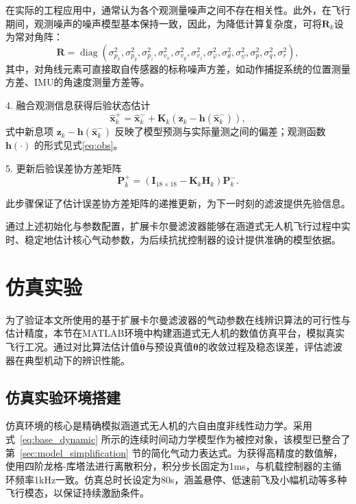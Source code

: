 在实际的工程应用中，通常认为各个观测量噪声之间不存在相关性。此外，在飞行期间，观测噪声的噪声模型基本保持一致，因此，为降低计算复杂度，可将$\boldsymbol{R}_k$设为常对角阵：
\begin{equation}
    \boldsymbol{R} = \operatorname{diag}(\sigma^2_{p_x},\sigma^2_{p_y}, \sigma^2_{p_z}, \sigma^2_{v_x},\sigma^2_{v_y}, \sigma^2_{v_z}, \sigma^2_{\varphi},\sigma^2_{\theta}, \sigma^2_{\psi}, \sigma^2_{p},\sigma^2_{q}, \sigma^2_{r}),
\end{equation}
其中，对角线元素可直接取自传感器的标称噪声方差，如动作捕捉系统的位置测量方差、IMU的角速度测量方差等。

4. 融合观测信息获得后验状态估计
\begin{equation}
    \hat{\boldsymbol{x}}_{k}^{+} = \hat{\boldsymbol{x}}_{k}^{-} + \boldsymbol{K}_k \left( \boldsymbol{z}_k - \boldsymbol{h}(\hat{\boldsymbol{x}}_{k}^{-}) \right),
\end{equation}
式中新息项 $\boldsymbol{z}_k - \boldsymbol{h}(\hat{\boldsymbol{x}}_{k}^{-})$ 反映了模型预测与实际量测之间的偏差；观测函数 $\boldsymbol{h}(\cdot)$ 的形式见式\eqref{eq:obs}。

5. 更新后验误差协方差矩阵
\begin{equation}
    \boldsymbol{P}_{k}^{+} = \left( \boldsymbol{I}_{18\times 18} - \boldsymbol{K}_k \boldsymbol{H}_k \right) \boldsymbol{P}_{k}^{-}.
\end{equation}

此步骤保证了估计误差协方差矩阵的递推更新，为下一时刻的滤波提供先验信息。

通过上述初始化与参数配置，扩展卡尔曼滤波器能够在涵道式无人机飞行过程中实时、稳定地估计核心气动参数，为后续抗扰控制器的设计提供准确的模型依据。

\section{仿真实验}%
为了验证本文所使用的基于扩展卡尔曼滤波器的气动参数在线辨识算法的可行性与估计精度，本节在MATLAB环境中构建涵道式无人机的数值仿真平台，模拟真实飞行工况。通过对比算法估计值$\hat{\boldsymbol{\theta}}$与预设真值$\boldsymbol{\theta}$的收敛过程及稳态误差，评估滤波器在典型机动下的辨识性能。

\subsection{仿真实验环境搭建}
仿真环境的核心是精确模拟涵道式无人机的六自由度非线性动力学。采用式~\eqref{eq:base_dynamic} 所示的连续时间动力学模型作为被控对象，该模型已整合了第~\ref{sec:model_simplification} 节的简化气动力表达式。为获得高精度的数值解，使用四阶龙格-库塔法进行离散积分，积分步长固定为1ms，与机载控制器的主循环频率1kHz一致。仿真总时长设定为80s，涵盖悬停、低速前飞及小幅机动等多种飞行模态，以保证持续激励条件。

